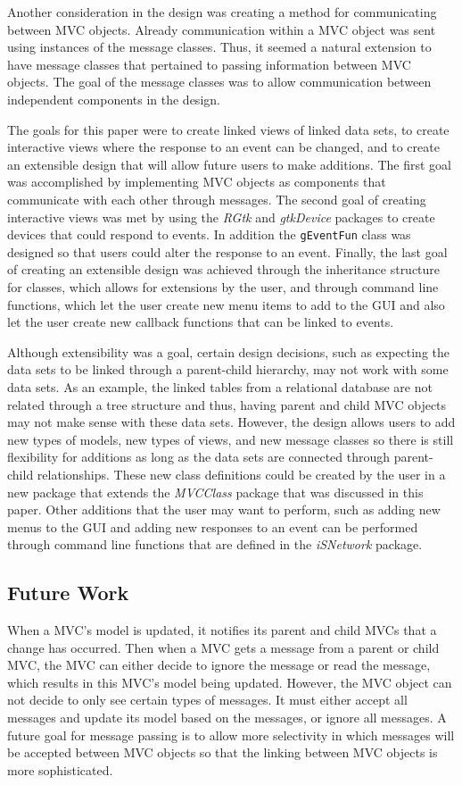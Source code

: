 \documentclass{article}[11pt]
\newcommand{\Robject}[1]{{\texttt{#1}}}
\newcommand{\Rpackage}[1]{{\textit{#1}}}
\begin{document}
Another consideration in the design was creating a method for communicating
between MVC objects.  Already communication within a MVC object was sent using
instances of the message classes.  Thus, it seemed a natural extension to have
message classes that pertained to passing information between MVC objects.
The goal of the message classes was to allow communication between independent
components in the design. 

The goals for this paper were to create linked views of linked data sets, to
create interactive views where the response to an event can be changed, and to
create an extensible design that will allow future users to make additions.
The first goal was accomplished by implementing MVC objects as components that
communicate with each other through messages.  The second goal of creating
interactive views was met by using the \Rpackage{RGtk} and
\Rpackage{gtkDevice} packages to create devices that could respond to events.
In addition the \Robject{gEventFun} class was designed so that users could
alter the response to an event.  Finally, the last goal of creating an
extensible design was achieved through the inheritance structure for classes,
which allows for extensions by the user, and through command line functions,
which let the user create new menu items to add to the GUI and also let the
user create new callback functions that can be linked to events. 

Although extensibility was a goal, certain design decisions, such as expecting
the data sets to be linked through 
a parent-child hierarchy, may not work with some data sets.  As an example,
the linked tables from a relational database are not related through a tree
structure and thus, having parent and child MVC objects may not make sense
with these data sets.  However, the design allows users to add new
types of models, new types of views, and new message classes so there is still
flexibility for additions as long as the data sets are connected through
parent-child relationships.  These new class definitions could be created by
the user in a new package that extends the \Rpackage{MVCClass} package that
was discussed in this paper.  Other additions that the user may want to
perform, such as adding new menus to the GUI and adding new responses to an
event can be performed through command line functions that are defined in the
\Rpackage{iSNetwork} package.

\subsection{Future Work}\label{Ssec:Further}

When a MVC's model is updated, it notifies its parent and child
MVCs that a change has occurred.  Then when a MVC gets a message from a
parent or child MVC, the MVC can either decide to ignore the message or read
the message, which results in this MVC's model being updated.  However, the
MVC object can not decide to only see certain types of messages.  It must
either accept all messages and update its model based on the messages, or
ignore all messages.  A future goal for message passing is to allow more
selectivity in which messages will be accepted between MVC objects so that the
linking between MVC objects is more sophisticated. 
\end{document}
